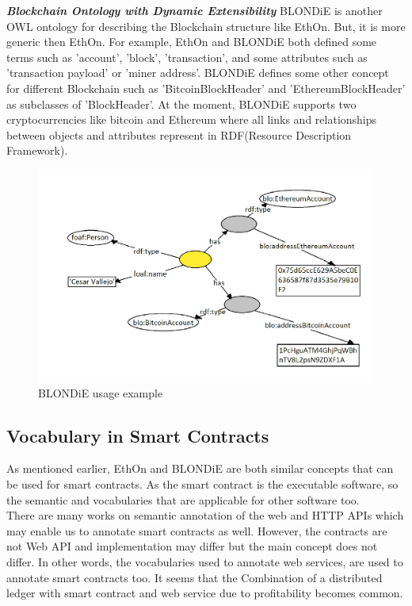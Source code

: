 \textbf{\textit{Blockchain Ontology with Dynamic Extensibility}}    
BLONDiE is another OWL ontology for describing the
Blockchain structure like EthOn. But, it is more generic then EthOn. For example, EthOn and BLONDiE both defined some terms such as 'account', 'block', 'transaction', and some attributes such as 'transaction payload' or 'miner address'. BLONDiE defines some other concept for different Blockchain such as 'BitcoinBlockHeader' and 'EthereumBlockHeader' as subclasses of 'BlockHeader'. At the moment, BLONDiE supports two cryptocurrencies like bitcoin and Ethereum where all links and relationships between objects and attributes represent in RDF(Resource Description Framework)\cite{Third}.
\begin{center}
	\begin{figure}[htb!]
		
		\begin{minipage}{0.55\linewidth}
			\centering
			\includegraphics[width=1.75\textwidth]{images/chap02_BLONDiE.png}
		\end{minipage}
		\caption[BLONDiE]{BLONDiE usage example\cite{Hector}}
		
		
	\end{figure}
	
\end{center}
\subsection{Vocabulary in Smart Contracts}
As mentioned earlier, EthOn and BLONDiE are both similar concepts that can be used for smart contracts. As the smart contract is the executable software, so the semantic and vocabularies that are applicable for other software too.\\
There are many works on semantic annotation of the web and HTTP APIs which may enable us to annotate smart contracts as well. However, the contracts are not Web API and implementation may differ but the main concept does not differ. In other words, the vocabularies used to annotate web services, are used to annotate smart contracts too. It seems that the Combination of a distributed ledger with smart contract and web service due to profitability becomes common\cite{Third}.


